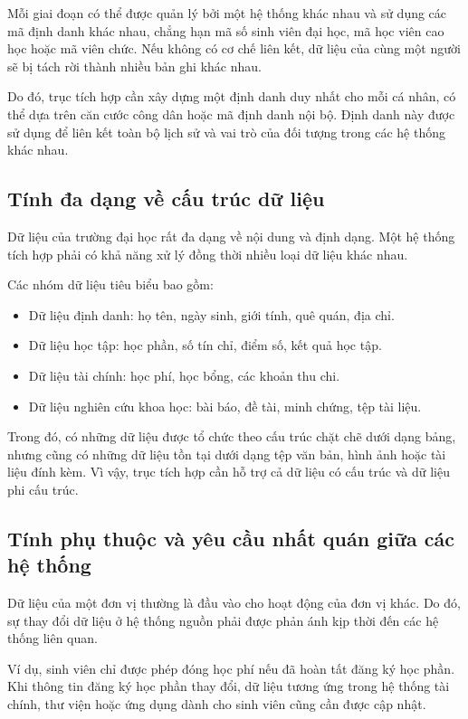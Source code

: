     Mỗi giai đoạn có thể được quản lý bởi một hệ thống khác nhau và sử dụng các mã định danh khác nhau, chẳng hạn mã số sinh viên đại học, mã học viên cao học hoặc mã viên chức. Nếu không có cơ chế liên kết, dữ liệu của cùng một người sẽ bị tách rời thành nhiều bản ghi khác nhau.
    
    Do đó, trục tích hợp cần xây dựng một định danh duy nhất cho mỗi cá nhân, có thể dựa trên căn cước công dân hoặc mã định danh nội bộ. Định danh này được sử dụng để liên kết toàn bộ lịch sử và vai trò của đối tượng trong các hệ thống khác nhau.

    \subsection{Tính đa dạng về cấu trúc dữ liệu}
    
    Dữ liệu của trường đại học rất đa dạng về nội dung và định dạng. Một hệ thống tích hợp phải có khả năng xử lý đồng thời nhiều loại dữ liệu khác nhau.
    
    Các nhóm dữ liệu tiêu biểu bao gồm:
    \begin{itemize}
        \item Dữ liệu định danh: họ tên, ngày sinh, giới tính, quê quán, địa chỉ.
        \item Dữ liệu học tập: học phần, số tín chỉ, điểm số, kết quả học tập.
        \item Dữ liệu tài chính: học phí, học bổng, các khoản thu chi.
        \item Dữ liệu nghiên cứu khoa học: bài báo, đề tài, minh chứng, tệp tài liệu.
    \end{itemize}
    
    Trong đó, có những dữ liệu được tổ chức theo cấu trúc chặt chẽ dưới dạng bảng, nhưng cũng có những dữ liệu tồn tại dưới dạng tệp văn bản, hình ảnh hoặc tài liệu đính kèm. Vì vậy, trục tích hợp cần hỗ trợ cả dữ liệu có cấu trúc và dữ liệu phi cấu trúc.

    \subsection{Tính phụ thuộc và yêu cầu nhất quán giữa các hệ thống}
    
    Dữ liệu của một đơn vị thường là đầu vào cho hoạt động của đơn vị khác. Do đó, sự thay đổi dữ liệu ở hệ thống nguồn phải được phản ánh kịp thời đến các hệ thống liên quan.
    
    Ví dụ, sinh viên chỉ được phép đóng học phí nếu đã hoàn tất đăng ký học phần. Khi thông tin đăng ký học phần thay đổi, dữ liệu tương ứng trong hệ thống tài chính, thư viện hoặc ứng dụng dành cho sinh viên cũng cần được cập nhật.
    
